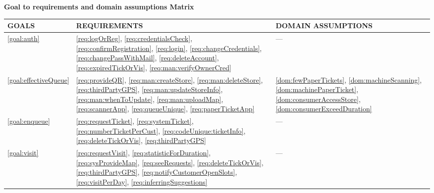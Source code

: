 \documentclass[a4paper, 12pt, oneside]{article}
\begin{document}
\newpage
\label{uc:gToReDMatrix}
\begin{center}
{\textbf{Goal to requirements and domain assumptions Matrix}}
\end{center}

\begin{tabularx}{\linewidth}{| p{20mm} | p{50mm} | p{50mm} |}

     \hline
	GOALS & REQUIREMENTS & DOMAIN ASSUMPTIONS \\
	\hline 
	\ref{goal:auth} & \ref{req:logOrReg}, \ref{req:credentialsCheck}, \ref{req:confirmRegistration}, \ref{req:login}, \ref{req:changeCredentials}, \ref{req:changePassWithMail}, \ref{req:deleteAccount}, \ref{req:expiredTickOrVis}, \ref{req:man:verifyOwnerCred} & --- \\
	
	\hline 
	\ref{goal:effectiveQueue} & \ref{req:provideQR}, \ref{req:man:createStore}, \ref{req:man:deleteStore},  \ref{req:thirdPartyGPS}, \ref{req:man:updateStoreInfo}, \ref{req:man:whenToUpdate}, \ref{req:man:uploadMap}, \ref{req:scannerApp}, \ref{req:queueUnique}, \ref{req:paperTicketApp} & \ref{dom:fewPaperTickets}, \ref{dom:machineScanning}, \ref{dom:machinePaperTicket}, \ref{dom:consumerAccessStore}, \ref{dom:consumerExceedDuration} \\
	
	\hline
	\ref{goal:enqueue} & \ref{req:requestTicket}, \ref{req:systemTicket}, \ref{req:numberTicketPerCust}, \ref{req:codeUnique:ticketInfo}, \ref{req:deleteTickOrVis}, \ref{req:thirdPartyGPS} & ---  \\

	\hline
	
	\ref{goal:visit} & \ref{req:requestVisit}, \ref{req:statisticForDuration}, \ref{req:sysProvideMap}, \ref{req:seeRequests}, \ref{req:deleteTickOrVis}, \ref{req:thirdPartyGPS}, \ref{req:notifyCustomerOpenSlots}, \ref{req:visitPerDay}, \ref{req:inferringSuggestions}  & ---  \\

	\hline
	
\end{tabularx}
\end{document}
